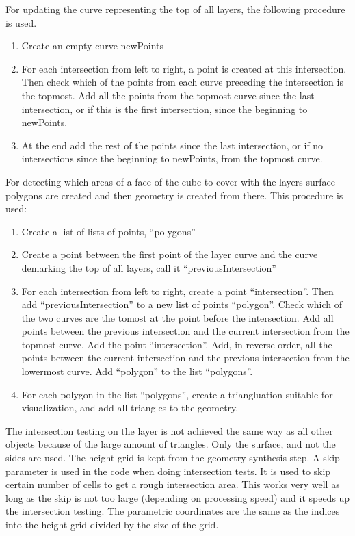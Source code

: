 \documentclass[a4paper,12pt]{report}
\begin{document}
For updating the curve representing the top of all layers, the following procedure is used. 
\begin{enumerate}
 \item Create an empty curve newPoints
 \item For each intersection from left to right, a point is created at this intersection. Then check which of the points from each curve preceding the intersection is the topmost. Add all the points from the topmost curve since the last intersection, or if this is the first intersection, since the beginning to newPoints.
 \item At the end add the rest of the points since the last intersection, or if no intersections since the beginning to newPoints, from the topmost curve.
\end{enumerate}

For detecting which areas of a face of the cube to cover with the layers surface polygons are created and then geometry is created from there. This procedure is used:
\begin{enumerate}
 \item Create a list of lists of points, ``polygons''
 \item Create a point between the first point of the layer curve and the curve demarking the top of all layers, call it ``previousIntersection''
 \item For each intersection from left to right, create a point ``intersection''. Then add ``previousIntersection'' to a new list of points ``polygon''. Check which of the two curves are the tomost at the point before the intersection. Add all points between the previous intersection and the current intersection from the topmost curve. Add the point ``intersection''. Add, in reverse order, all the points between the current intersection and the previous intersection from the lowermost curve. Add ``polygon'' to the list ``polygons''.
 \item For each polygon in the list ``polygons'', create a triangluation suitable for visualization, and add all triangles to the geometry.
\end{enumerate}

The intersection testing on the layer is not achieved the same way as all other objects because of the large amount of triangles. Only the surface, and not the sides are used. The height grid is kept from the geometry synthesis step. A skip parameter is used in the code when doing intersection tests. It is used to skip certain number of cells to get a rough intersection area. This works very well as long as the skip is not too large (depending on processing speed) and it speeds up the intersection testing. The parametric coordinates are the same as the indices into the height grid divided by the size of the grid.
\end{document}
